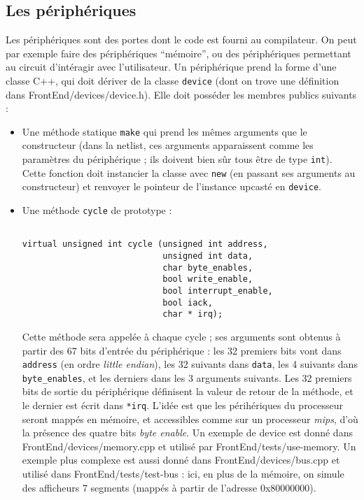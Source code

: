 \documentclass{article}
\begin{document}
\subsection{Les périphériques}

Les périphériques sont des portes dont le code est fourni au compilateur. On peut par exemple faire des périphériques ``mémoire'', ou des périphériques permettant au circuit d'intéragir avec l'utilisateur. Un périphérique prend la forme d'une classe C++, qui doit dériver de la classe \texttt{device} (dont on trove une définition dans FrontEnd/devices/device.h). Elle doit posséder les membres publics suivants :
\begin{itemize}
\item Une méthode statique \texttt{make} qui prend les mêmes arguments que le constructeur (dans la netlist, ces arguments apparaissent comme les paramètres du périphérique ; ils doivent bien sûr tous être de type \texttt{int}). Cette fonction doit instancier la classe avec \texttt{new} (en passant ses arguments au constructeur) et renvoyer le pointeur de l'instance upcasté en \texttt{device}.
\item Une méthode \texttt{cycle} de prototype :
\begin{verbatim}

virtual unsigned int cycle (unsigned int address,
                            unsigned int data,
                            char byte_enables,
                            bool write_enable,
                            bool interrupt_enable,
                            bool iack,
                            char * irq);

\end{verbatim}
Cette méthode sera appelée à chaque cycle ; ses arguments sont obtenus à partir des 67 bits d'entrée du périphérique : les 32 premiers bits vont dans \texttt{address} (en ordre \emph{little endian}), les 32 suivants dans \texttt{data}, les 4 suivants dans \texttt{byte\_enables}, et les derniers dans les 3 arguments suivants. Les 32 premiers bits de sortie du périphérique définisent la valeur de retour de la méthode, et le dernier est écrit dans \texttt{*irq}. L'idée est que les périhériques du processeur seront mappés en mémoire, et accessibles comme sur un processeur \emph{mips}, d'où la présence des quatre bits \emph{byte enable}. Un exemple de device est donné dans FrontEnd/devices/memory.cpp et utilisé par FrontEnd/tests/use-memory. Un exemple plus complexe est aussi donné dans FrontEnd/devices/bus.cpp et utilisé dans FrontEnd/tests/test-bus : ici, en plus de la mémoire, on simule des afficheurs 7 segments (mappés à partir de l'adresse 0x80000000).
\end{itemize}
\end{document}
